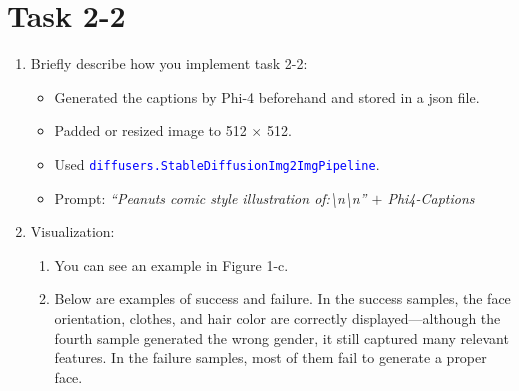 \documentclass{article}
\begin{document}
\section*{Task 2-2}
\begin{enumerate}
	\item Briefly describe how you implement task 2-2:
		\begin{itemize}
			\item Generated the captions by Phi-4 beforehand and stored in a json file.
			\item Padded or resized image to 512 $\times$ 512.
			\item Used \textcolor{blue}{\texttt{diffusers.StableDiffusionImg2ImgPipeline}}.
			\item Prompt: \textit{``Peanuts comic style illustration of:\textbackslash n\textbackslash n'' $+$ Phi4-Captions}
		\end{itemize}
	\item Visualization:
		\begin{enumerate}
			\item You can see an example in Figure 1-c.
			\item Below are examples of success and failure. In the success samples, the face orientation, clothes, and hair color are correctly displayed—although the fourth sample generated the wrong gender, it still captured many relevant features. In the failure samples, most of them fail to generate a proper face.
				\begin{figure}[h!]
					\centering
					\begin{minipage}{0.8\textwidth}
						\centering


\end{minipage}
\end{figure}
\end{enumerate}
\end{enumerate}
\end{document}
